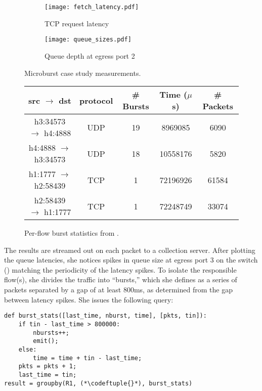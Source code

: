 \begin{figure}[!t]
\centering
\begin{subfigure}[t]{0.48\columnwidth}
\raggedright
\texttt{[image: fetch\_latency.pdf]}
\vspace{-0.2in}
\caption{TCP request latency}
\label{fig:mininet-latency}
\end{subfigure}
\begin{subfigure}[t]{0.48\columnwidth}
\raggedleft
\texttt{[image: queue\_sizes.pdf]}
\vspace{-0.2in}
\caption{Queue depth at egress port 2}
\label{fig:mininet-qin}
\end{subfigure}
\vspace{-0.1in}
\caption{Microburst case study measurements.}
\end{figure}
\begin{figure}[t]
\vspace{0.083in}
\centering
\small
\begin{tabular}{c c c c c} \hline
\textbf{src $\rightarrow$ dst} & \textbf{protocol} & \textbf{\# Bursts} & \textbf{Time ($\mu$s)} & \textbf{\# Packets} \\ \hline \hline
h3:34573 $\rightarrow$ h4:4888 & UDP & 19 & 8969085 & 6090  \\ \hline
h4:4888 $\rightarrow$ h3:34573 & UDP & 18 & 10558176 & 5820 \\ \hline
h1:1777 $\rightarrow$ h2:58439 & TCP & 1 & 72196926 & 61584 \\ \hline
h2:58439 $\rightarrow$ h1:1777 & TCP & 1 & 72248749 & 33074 \\ \hline
\end{tabular}
\vspace{-0.1in}
\caption{Per-flow burst statistics from \TheSystem.}
\label{fig:mininet-flowstats}
\vspace{-0.1in}
\end{figure}

The results are streamed out on each packet to a collection server. After
plotting the queue latencies, she notices spikes in queue size at egress port 3
on the switch () matching the periodicity of the latency
spikes. To isolate the responsible flow(s), she divides the traffic into
``bursts,'' which she defines as a series of packets separated by a gap of at
least 800ms, as determined from the gap between latency spikes. She issues the
following \TheSystem query:

\begin{small}
\begin{lstlisting}
def burst_stats([last_time, nburst, time], [pkts, tin]):
    if tin - last_time > 800000:
        nbursts++;
        emit();
    else:
        time = time + tin - last_time;
    pkts = pkts + 1;
    last_time = tin;
result = groupby(R1, (*\codeftuple{}*), burst_stats)
\end{lstlisting}
\end{small}

